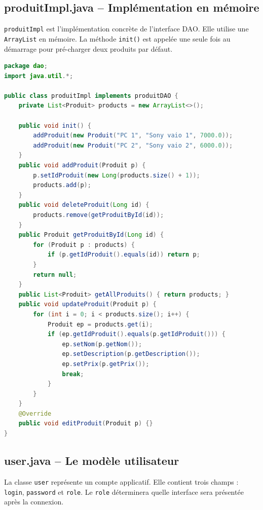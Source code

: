 \documentclass[12pt, a4paper]{article}
\begin{document}
\subsection{produitImpl.java -- Implémentation en mémoire}

\texttt{produitImpl} est l'implémentation concrète de l'interface DAO. Elle utilise une \texttt{ArrayList} en mémoire. La méthode \texttt{init()} est appelée une seule fois au démarrage pour pré-charger deux produits par défaut.

\begin{lstlisting}[language=Java, style=javastyle, caption=dao/produitImpl.java]
package dao;
import java.util.*;

public class produitImpl implements produitDAO {
    private List<Produit> products = new ArrayList<>();

    public void init() {
        addProduit(new Produit("PC 1", "Sony vaio 1", 7000.0));
        addProduit(new Produit("PC 2", "Sony vaio 2", 6000.0));
    }
    public void addProduit(Produit p) {
        p.setIdProduit(new Long(products.size() + 1));
        products.add(p);
    }
    public void deleteProduit(Long id) {
        products.remove(getProduitById(id));
    }
    public Produit getProduitById(Long id) {
        for (Produit p : products) {
            if (p.getIdProduit().equals(id)) return p;
        }
        return null;
    }
    public List<Produit> getAllProduits() { return products; }
    public void updateProduit(Produit p) {
        for (int i = 0; i < products.size(); i++) {
            Produit ep = products.get(i);
            if (ep.getIdProduit().equals(p.getIdProduit())) {
                ep.setNom(p.getNom());
                ep.setDescription(p.getDescription());
                ep.setPrix(p.getPrix());
                break;
            }
        }
    }
    @Override
    public void editProduit(Produit p) {}
}
\end{lstlisting}

\subsection{user.java -- Le modèle utilisateur}

La classe \texttt{user} représente un compte applicatif. Elle contient trois champs : \texttt{login}, \texttt{password} et \texttt{role}. Le \texttt{role} déterminera quelle interface sera présentée après la connexion.
\end{document}

